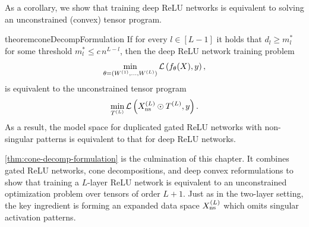As a corollary, we show that training deep ReLU networks is equivalent to
solving an unconstrained (convex) tensor program.

\begin{restatable}{theorem}{coneDecompFormulation}\label{thm:cone-decomp-formulation}
    If for every \( l \in [L-1]  \) it holds that
    \( d_l \geq m^{*}_{l} \) for some threshold \( m^{*}_{l} \leq c \, n^{L - l} \),
    then the deep ReLU network training problem
    \begin{equation*}
        \min_{\theta = (W^{(1)}, \ldots, W^{(L)})} \mathcal{L}\left(f_{\theta}(X), y\right),
    \end{equation*}
    is equivalent to the unconstrained tensor program
    \begin{equation}
        \min_{T^{(L)}}
        \mathcal{L}\left(X^{(L)}_{\text{ns}} \odot T^{(L)}, y\right).
    \end{equation}
    As a result, the model space for duplicated gated ReLU networks with
    non-singular patterns is equivalent to that for deep ReLU networks.
\end{restatable}

\cref{thm:cone-decomp-formulation} is the culmination of this chapter.
It combines gated ReLU networks, cone decompositions, and deep convex
reformulations to show that training a \( L \)-layer ReLU network is equivalent
to an unconstrained optimization problem over tensors of order \( L+1 \).
Just as in the two-layer setting, the key ingredient is forming an expanded
data space \( X^{(L)}_{\text{ns}} \) which omits singular activation patterns.

